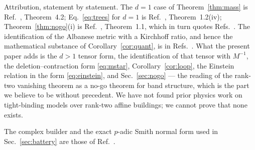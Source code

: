 \documentclass[aps,prb,reprint,amsmath,amssymb,floatfix,superscriptaddress]{revtex4-2}
\theoremstyle{plain}
\theoremstyle{definition}
\theoremstyle{remark}
\begin{document}
Attribution, statement by statement. The $d=1$ case of Theorem~\ref{thm:mass} is
Ref.~, Theorem~4.2; Eq.~\eqref{eq:trees} for $d=1$ is
Ref.~, Theorem~1.2(iv); Theorem~\ref{thm:nogo}(i) is
Ref.~, Theorem~1.1, which in turn quotes Refs.~. The
identification of the Albanese metric with a Kirchhoff ratio, and hence the mathematical
substance of Corollary~\ref{cor:quant}, is in Refs.~. What the present
paper adds is the $d>1$ tensor form, the identification of that tensor with $M^{-1}$, the
deletion--contraction form \eqref{eq:mstar}, Corollary~\ref{cor:loop}, the Einstein relation
in the form \eqref{eq:einstein}, and Sec.~\ref{sec:nogo} --- the reading of the rank-two
vanishing theorem as a no-go theorem for band structure, which is the part we believe to be
without precedent. We have not found prior physics work on tight-binding models over
rank-two affine buildings; we cannot prove that none exists.

\begin{acknowledgments}
The complex builder and the exact $p$-adic Smith normal form used in Sec.~\ref{sec:battery}
are those of Ref.~.
\end{acknowledgments}
\end{document}

